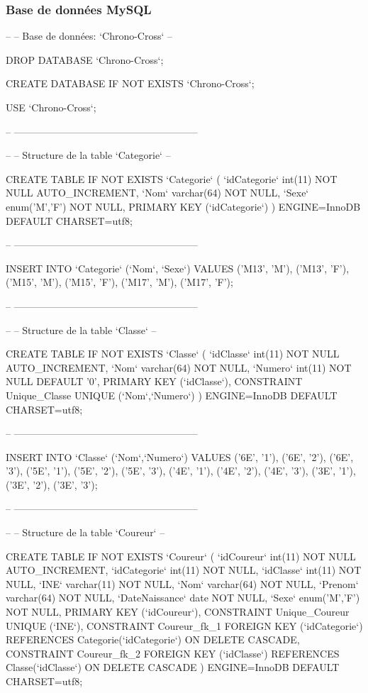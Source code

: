 \subsubsection*{Base de données My\+S\+QL}


\begin{DoxyCode}
--
-- Base de données: `Chrono-Cross`
--

DROP DATABASE `Chrono-Cross`;

CREATE DATABASE IF NOT EXISTS `Chrono-Cross`;

USE `Chrono-Cross`;

-- --------------------------------------------------------

--
-- Structure de la table `Categorie`
--

CREATE TABLE IF NOT EXISTS `Categorie` (
  `idCategorie` int(11) NOT NULL AUTO\_INCREMENT,
  `Nom` varchar(64) NOT NULL,
  `Sexe` enum('M','F') NOT NULL,
  PRIMARY KEY (`idCategorie`)
) ENGINE=InnoDB DEFAULT CHARSET=utf8;

-- --------------------------------------------------------

INSERT INTO `Categorie` (`Nom`, `Sexe`) VALUES
('M13', 'M'),
('M13', 'F'),
('M15', 'M'),
('M15', 'F'),
('M17', 'M'),
('M17', 'F');

-- --------------------------------------------------------

--
-- Structure de la table `Classe`
--

CREATE TABLE IF NOT EXISTS `Classe` (
  `idClasse` int(11) NOT NULL AUTO\_INCREMENT,
  `Nom` varchar(64) NOT NULL,
  `Numero` int(11) NOT NULL DEFAULT '0',
  PRIMARY KEY (`idClasse`),
  CONSTRAINT Unique\_Classe UNIQUE (`Nom`,`Numero`)
) ENGINE=InnoDB DEFAULT CHARSET=utf8;

-- --------------------------------------------------------

INSERT INTO `Classe` (`Nom`,`Numero`) VALUES
('6E', '1'),
('6E', '2'),
('6E', '3'),
('5E', '1'),
('5E', '2'),
('5E', '3'),
('4E', '1'),
('4E', '2'),
('4E', '3'),
('3E', '1'),
('3E', '2'),
('3E', '3');

-- --------------------------------------------------------

--
-- Structure de la table `Coureur`
--

CREATE TABLE IF NOT EXISTS `Coureur` (
  `idCoureur` int(11) NOT NULL AUTO\_INCREMENT,
  `idCategorie` int(11) NOT NULL,
  `idClasse` int(11) NOT NULL,
  `INE` varchar(11) NOT NULL,
  `Nom` varchar(64) NOT NULL,
  `Prenom` varchar(64) NOT NULL,
  `DateNaissance` date NOT NULL,
  `Sexe` enum('M','F') NOT NULL,
  PRIMARY KEY (`idCoureur`),
  CONSTRAINT Unique\_Coureur UNIQUE (`INE`),
  CONSTRAINT Coureur\_fk\_1 FOREIGN KEY (`idCategorie`) REFERENCES Categorie(`idCategorie`) ON DELETE
       CASCADE,
  CONSTRAINT Coureur\_fk\_2 FOREIGN KEY (`idClasse`) REFERENCES Classe(`idClasse`) ON DELETE CASCADE
) ENGINE=InnoDB DEFAULT CHARSET=utf8;


\end{DoxyCode}
